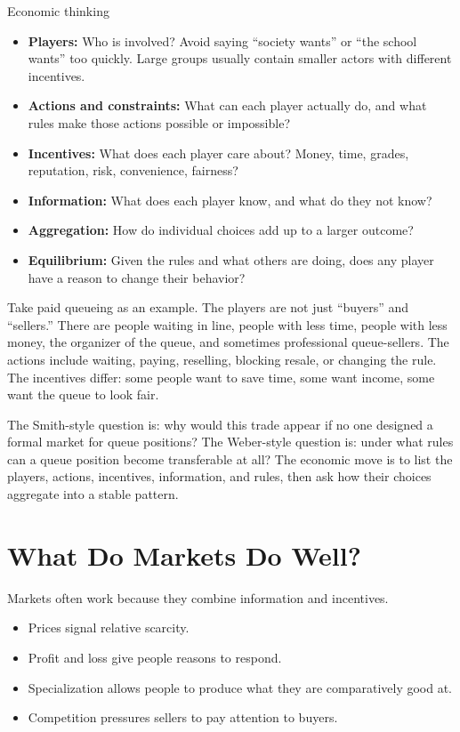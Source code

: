 \documentclass[10pt,a4paper]{article}
\begin{document}
\begin{conceptbox}{Economic thinking}
\begin{itemize}
  \item \textbf{Players:} Who is involved? Avoid saying ``society wants'' or ``the school wants'' too quickly. Large groups usually contain smaller actors with different incentives.
  \item \textbf{Actions and constraints:} What can each player actually do, and what rules make those actions possible or impossible?
  \item \textbf{Incentives:} What does each player care about? Money, time, grades, reputation, risk, convenience, fairness?
  \item \textbf{Information:} What does each player know, and what do they not know?
  \item \textbf{Aggregation:} How do individual choices add up to a larger outcome?
  \item \textbf{Equilibrium:} Given the rules and what others are doing, does any player have a reason to change their behavior?
\end{itemize}
\end{conceptbox}

Take paid queueing as an example. The players are not just ``buyers'' and ``sellers.'' There are people waiting in line, people with less time, people with less money, the organizer of the queue, and sometimes professional queue-sellers. The actions include waiting, paying, reselling, blocking resale, or changing the rule. The incentives differ: some people want to save time, some want income, some want the queue to look fair.

The Smith-style question is: why would this trade appear if no one designed a formal market for queue positions? The Weber-style question is: under what rules can a queue position become transferable at all? The economic move is to list the players, actions, incentives, information, and rules, then ask how their choices aggregate into a stable pattern.

\section{What Do Markets Do Well?}

Markets often work because they combine information and incentives.

\begin{itemize}
  \item Prices signal relative scarcity.
  \item Profit and loss give people reasons to respond.
  \item Specialization allows people to produce what they are comparatively good at.
  \item Competition pressures sellers to pay attention to buyers.
\end{itemize}
\end{document}
